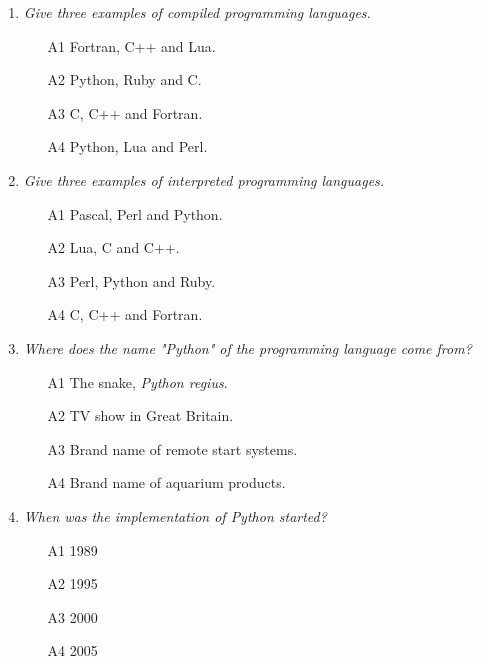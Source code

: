 \begin{enumerate}
\item {\em Give three examples of compiled programming languages.}\\

\begin{enumerate}
\item[A1] Fortran, C++ and Lua.
\item[A2] Python, Ruby and C.
\item[A3] C, C++ and Fortran.
\item[A4] Python, Lua and Perl.
\end{enumerate}
\vspace{4mm}

\item {\em Give three examples of interpreted programming languages.}\\

\begin{enumerate}
\item[A1] Pascal, Perl and Python.
\item[A2] Lua, C and C++.
\item[A3] Perl, Python and Ruby. 
\item[A4] C, C++ and Fortran.
\end{enumerate}
\vspace{4mm}

\item {\em Where does the name "Python" of the programming language come from?}\\

\begin{enumerate}
\item[A1] The snake, {\em Python regius}.
\item[A2] TV show in Great Britain.
\item[A3] Brand name of remote start systems.
\item[A4] Brand name of aquarium products.
\end{enumerate}
\vspace{4mm}

\item {\em When was the implementation of Python started?}\\

\begin{enumerate}
\item[A1] 1989
\item[A2] 1995
\item[A3] 2000
\item[A4] 2005
\end{enumerate}
\vspace{4mm}


\end{enumerate}
